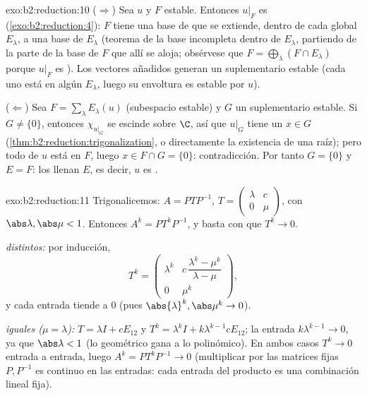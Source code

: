 \begin{solution}{exo:b2:reduction:10}
($\Rightarrow$) Sea $u$  y $F$ estable. Entonces
$u|_F$ es  (\cref{exo:b2:reduction:4}): $F$ tiene una
base de  que se extiende, dentro de cada
 global $E_\lambda$, a una base de $E_\lambda$
(teorema de la base incompleta dentro de $E_\lambda$, partiendo de la
parte de la base de $F$ que allí se aloja; obsérvese que $F =
\bigoplus_\lambda (F \cap E_\lambda)$ porque $u|_F$ es
). Los vectores añadidos generan un suplementario
estable (cada uno está en algún $E_\lambda$, luego su envoltura es
estable por $u$).

($\Leftarrow$) Sea $F = \sum_\lambda E_\lambda(u)$ (subespacio
estable) y $G$ un suplementario estable. Si $G \neq \{0\}$, entonces
$\chi_{u|_G}$ se escinde sobre $\C$, así que $u|_G$ tiene un
 $x \in G$
(\cref{thm:b2:reduction:trigonalization}, o directamente la
existencia de una raíz); pero todo  de $u$ está en $F$,
luego $x \in F \cap G = \{0\}$: contradicción. Por tanto $G = \{0\}$
y $E = F$: los  llenan $E$, es decir, $u$ es
.
\end{solution}

\begin{solution}{exo:b2:reduction:11}
Trigonalicemos: $A = PTP^{-1}$, $T = \begin{pmatrix} \lambda & c\\ 0
& \mu\end{pmatrix}$, con $\abs\lambda, \abs\mu < 1$. Entonces $A^k =
PT^kP^{-1}$, y basta con que $T^k \to 0$.

\emph{ distintos:} por inducción,
\[
T^k = \begin{pmatrix}
\lambda^k & c\,\dfrac{\lambda^k - \mu^k}{\lambda - \mu}\\[4pt]
0 & \mu^k
\end{pmatrix},
\]
y cada entrada tiende a $0$ (pues $\abs{\lambda}^k, \abs\mu^k \to
0$).

\emph{ iguales ($\mu = \lambda$):} $T = \lambda I +
cE_{12}$ y $T^k = \lambda^k I + k\lambda^{k-1}cE_{12}$; la entrada
$k\lambda^{k-1} \to 0$, ya que $\abs\lambda < 1$ (lo geométrico gana
a lo polinómico). En ambos casos $T^k \to 0$ entrada a entrada, luego
$A^k = PT^kP^{-1} \to 0$ (multiplicar por las matrices fijas $P,
P^{-1}$ es continuo en las entradas: cada entrada del producto es una
combinación lineal fija).
\end{solution}

